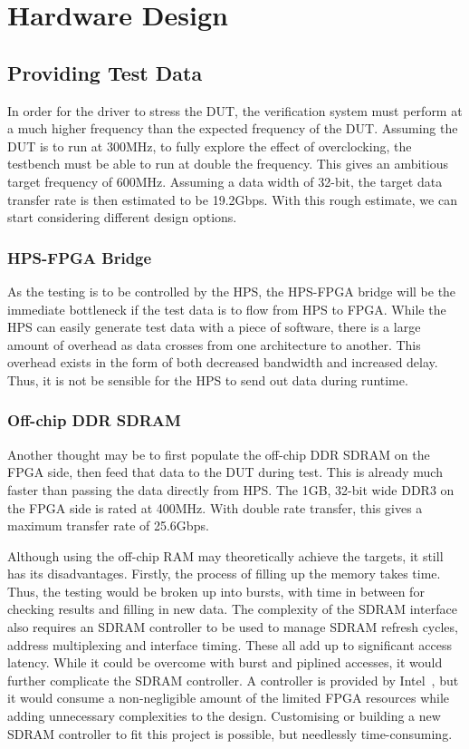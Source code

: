 \chapter{Hardware Design}

\section{Providing Test Data}
In order for the driver to stress the DUT, the verification system must perform at a much higher frequency than the expected frequency of the DUT.
Assuming the DUT is to run at 300MHz, to fully explore the effect of overclocking, the testbench must be able to run at double the frequency.
This gives an ambitious target frequency of 600MHz.
Assuming a data width of 32-bit, the target data transfer rate is then estimated to be 19.2Gbps.
With this rough estimate, we can start considering different design options.

\subsection{HPS-FPGA Bridge}
As the testing is to be controlled by the HPS, the HPS-FPGA bridge will be the immediate bottleneck if the test data is to flow from HPS to FPGA.
While the HPS can easily generate test data with a piece of software, there is a large amount of overhead as data crosses from one architecture to another.
This overhead exists in the form of both decreased bandwidth and increased delay.
Thus, it is not be sensible for the HPS to send out data during runtime.

\subsection{Off-chip DDR SDRAM}
Another thought may be to first populate the off-chip DDR SDRAM on the FPGA side, then feed that data to the DUT during test.
This is already much faster than passing the data directly from HPS.
The 1GB, 32-bit wide DDR3 on the FPGA side is rated at 400MHz.
With double rate transfer, this gives a maximum transfer rate of 25.6Gbps.

Although using the off-chip RAM may theoretically achieve the targets, it still has its disadvantages.
Firstly, the process of filling up the memory takes time.
Thus, the testing would be broken up into bursts, with time in between for checking results and filling in new data.
The complexity of the SDRAM interface also requires an SDRAM controller to be used to manage SDRAM refresh cycles, address multiplexing and interface timing.
These all add up to significant access latency.
While it could be overcome with burst and piplined accesses, it would further complicate the SDRAM controller.
A controller is provided by Intel~\cite{Altera3}, but it would consume a non-negligible amount of the limited FPGA resources while adding unnecessary complexities to the design.
Customising or building a new SDRAM controller to fit this project is possible, but needlessly time-consuming.


